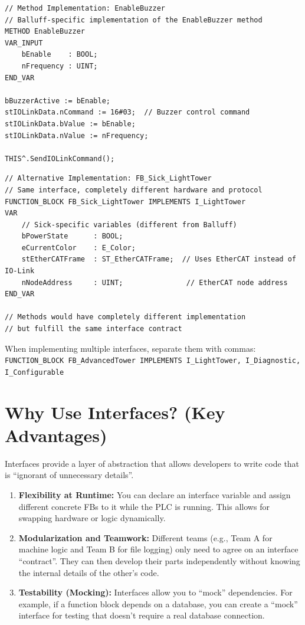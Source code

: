 \documentclass[11pt,a4paper]{article}
\begin{document}
\begin{lstlisting}
// Method Implementation: EnableBuzzer
// Balluff-specific implementation of the EnableBuzzer method
METHOD EnableBuzzer
VAR_INPUT
    bEnable    : BOOL;
    nFrequency : UINT;
END_VAR

bBuzzerActive := bEnable;
stIOLinkData.nCommand := 16#03;  // Buzzer control command
stIOLinkData.bValue := bEnable;
stIOLinkData.nValue := nFrequency;

THIS^.SendIOLinkCommand();
\end{lstlisting}

\begin{lstlisting}
// Alternative Implementation: FB_Sick_LightTower
// Same interface, completely different hardware and protocol
FUNCTION_BLOCK FB_Sick_LightTower IMPLEMENTS I_LightTower
VAR
    // Sick-specific variables (different from Balluff)
    bPowerState      : BOOL;
    eCurrentColor    : E_Color;
    stEtherCATFrame  : ST_EtherCATFrame;  // Uses EtherCAT instead of IO-Link
    nNodeAddress     : UINT;               // EtherCAT node address
END_VAR

// Methods would have completely different implementation
// but fulfill the same interface contract
\end{lstlisting}

\begin{tipbox}
When implementing multiple interfaces, separate them with commas:\\
\texttt{FUNCTION\_BLOCK FB\_AdvancedTower IMPLEMENTS I\_LightTower, I\_Diagnostic, I\_Configurable}
\end{tipbox}

\section{Why Use Interfaces? (Key Advantages)}

Interfaces provide a layer of abstraction that allows developers to write code that is ``ignorant of unnecessary details''.

\begin{enumerate}[leftmargin=*]
    \item \textbf{Flexibility at Runtime:} You can declare an interface variable and assign different concrete FBs to it while the PLC is running. This allows for swapping hardware or logic dynamically.
    
    \item \textbf{Modularization and Teamwork:} Different teams (e.g., Team A for machine logic and Team B for file logging) only need to agree on an interface ``contract''. They can then develop their parts independently without knowing the internal details of the other's code.
    
    \item \textbf{Testability (Mocking):} Interfaces allow you to ``mock'' dependencies. For example, if a function block depends on a database, you can create a ``mock'' interface for testing that doesn't require a real database connection.
\end{enumerate}
\end{document}
